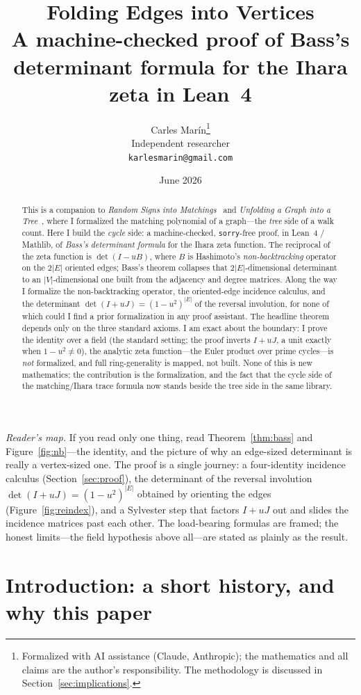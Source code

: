 \documentclass[11pt]{article}
\title{\bf Folding Edges into Vertices\\[4pt]
  \large\normalfont A machine-checked proof of Bass's determinant formula for the Ihara zeta in Lean~4}
\author{Carles Mar\'in\thanks{Formalized with AI assistance (Claude, Anthropic); the mathematics and all claims are the author's responsibility. The methodology is discussed in Section~\ref{sec:implications}.}\\[3pt]
  \normalsize Independent researcher\\
  \normalsize \texttt{karlesmarin@gmail.com}}
\date{June 2026}
\newcommand{\lean}[1]{\texttt{#1}}
\begin{document}
\maketitle

\begin{abstract}
This is a companion to \emph{Random Signs into Matchings}~\cite{PartI} and \emph{Unfolding a
Graph into a Tree}~\cite{PartII}, where I formalized the matching polynomial of a graph---the
\emph{tree} side of a walk count. Here I build the \emph{cycle} side: a machine-checked,
\lean{sorry}-free proof, in Lean~4 / Mathlib, of \emph{Bass's determinant formula} for the Ihara
zeta function. The reciprocal of the zeta function is $\det(I-uB)$, where $B$ is Hashimoto's
\emph{non-backtracking} operator on the $2|E|$ oriented edges; Bass's theorem collapses that
$2|E|$-dimensional determinant to an $|V|$-dimensional one built from the adjacency and degree
matrices. Along the way I formalize the non-backtracking operator, the oriented-edge incidence
calculus, and the determinant $\det(I+uJ)=(1-u^2)^{|E|}$ of the reversal involution, for none of
which could I find a prior formalization in any proof assistant. The headline theorem depends only
on the three standard axioms. I am exact about the boundary: I prove the identity over a field (the
standard setting; the proof inverts $I+uJ$, a unit exactly when $1-u^2\neq0$), the analytic zeta
function---the Euler product over prime cycles---is \emph{not} formalized, and full ring-generality
is mapped, not built. None of this is new mathematics; the contribution is the formalization, and
the fact that the cycle side of the matching/Ihara trace formula now stands beside the tree side in
the same library.
\end{abstract}

\noindent\emph{Reader's map.} If you read only one thing, read Theorem~\ref{thm:bass} and
Figure~\ref{fig:nb}---the identity, and the picture of why an edge-sized determinant is really a
vertex-sized one. The proof is a single journey: a four-identity incidence calculus
(Section~\ref{sec:proof}), the determinant of the reversal involution
$\det(I+uJ)=(1-u^2)^{|E|}$ obtained by orienting the edges (Figure~\ref{fig:reindex}), and a
Sylvester step that factors $I+uJ$ out and slides the incidence matrices past each other. The
load-bearing formulas are framed; the honest limits---the field hypothesis above all---are stated
as plainly as the result.

\section{Introduction: a short history, and why this paper}
\label{sec:intro}
\end{document}
